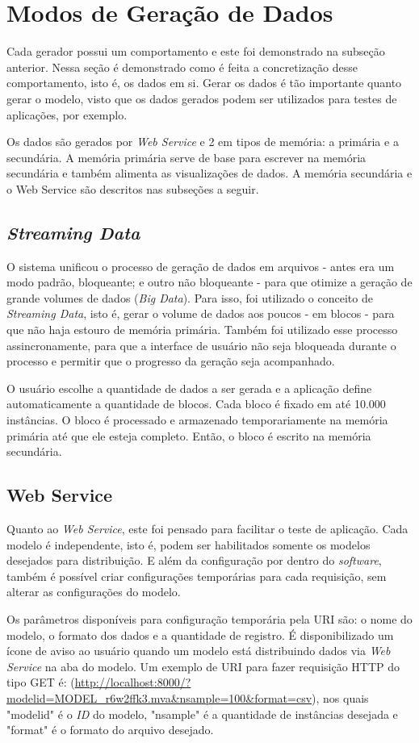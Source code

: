 \documentclass[
	12pt,				%
	openright,			%
	twoside,			%
	a4paper,			%
	english,			%
	brazil				%
	]{abntex2}
\begin{document}
	\section{Modos de Geração de Dados}
		Cada gerador possui um comportamento e este foi demonstrado na subseção anterior. 
		Nessa seção é demonstrado como é feita a concretização desse comportamento, isto é, os dados em si.
		Gerar os dados é tão importante quanto gerar o modelo, visto que os dados gerados podem ser utilizados para testes de aplicações, por exemplo.
		\par
		Os dados são gerados por \emph{Web Service} e 2 em tipos de memória: a primária e a secundária.
		A memória primária serve de base para escrever na memória secundária e também alimenta as visualizações de dados.
		A memória secundária e o Web Service são descritos nas subseções a seguir.

		\subsection{\emph{Streaming Data}}
			O sistema unificou o processo de geração de dados em arquivos - antes era um modo padrão, bloqueante; e outro não bloqueante - para que otimize a geração de grande volumes de dados (\emph{Big Data}).
			Para isso, foi utilizado o conceito de \emph{Streaming Data}, isto é, gerar o volume de dados aos poucos - em blocos - para que não haja estouro de memória primária.
			Também foi utilizado esse processo assincronamente, para que a interface de usuário não seja bloqueada durante o processo e permitir que o progresso da geração seja acompanhado.
			\par
			O usuário escolhe a quantidade de dados a ser gerada e a aplicação define automaticamente a quantidade de blocos.
			Cada bloco é fixado em até 10.000 instâncias.
			O bloco é processado e armazenado temporariamente na memória primária até que ele esteja completo.
			Então, o bloco é escrito na memória secundária.
		\subsection{Web Service}
			Quanto ao \emph{Web Service}, este foi pensado para facilitar o teste de aplicação.
			Cada modelo é independente, isto é, podem ser habilitados somente os modelos desejados para distribuição.
			E além da configuração por dentro do \emph{software}, também é possível criar configurações temporárias para cada requisição, sem alterar as configurações do modelo.
			\par
			Os parâmetros disponíveis para configuração temporária pela URI são: o nome do modelo, o formato dos dados e a quantidade de registro.
			É disponibilizado um ícone de aviso ao usuário quando um modelo está distribuindo dados via \emph{Web Service} na aba do modelo.
			Um exemplo de URI para fazer requisição HTTP do tipo GET é: (\url{http://localhost:8000/?modelid=MODEL_r6w2ffk3.mva&nsample=100&format=csv}), nos quais "modelid" é o \emph{ID} do modelo, "nsample" é a quantidade de instâncias desejada e "format" é o formato do arquivo desejado.
	 
\end{document}
